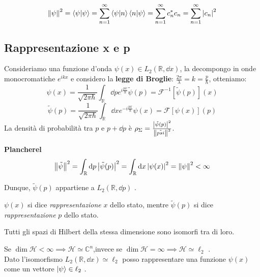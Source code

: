 \begin{example}
    \[
    \norm{\psi}^2= \braket{\psi}= \sum_{n=1}^{\infty} \braket{\psi}{n}\braket{n}{\psi}=
    \sum_{n=1}^{\infty}c^*_n c_n    = \sum_{n=1}^{\infty} \abs{c_n}^2   
    \]
\end{example}


\subsection{Rappresentazione x e p}
Consideriamo una funzione d'onda \(\psi(x) \in L_2(\mathbb{R}, \dd{x})\),
la decompongo in onde monocromatiche \(e^{ikx}\) e considero la \textbf{legge di Broglie}: \(\frac{2\pi}{\lambda}= k = \frac{p}{\hbar}\), otteniamo:
\[
\psi(x)= \frac{1}{\sqrt{2\pi\hbar}}\int_{\mathbb{R}} \dd{p} e^{i\frac{px}{\hbar}} \tilde{\psi}(p) = \mathcal{F}^{-1}[\tilde{\psi}(p)](x)
\]
\[
\tilde{\psi}(p)= \frac{1}{\sqrt{2\pi\hbar}}\int_{\mathbb{R}} \dd{x} e^{-i\frac{px}{\hbar}} \psi(x)= \mathcal{F}[\psi(x)](p)
\]
La densità di probabilità tra \(p\) e \(p +\dd{p}\) è \(\rho_\Sigma= \frac{\abs{\tilde{\psi}(p)}^2}{\norm{\tilde{psi}}^2}\).
\begin{theorem}
    \textbf{Plancherel}
    \[
    \norm{\tilde{\psi}}^2= \int_{\mathbb{R}} \dd{p} \abs{\tilde{\psi}(p)}^2= \int_{\mathbb{R}} \dd{x} \abs{\psi(x)}^2 = \norm{\psi}^2 <\infty
    \]
\end{theorem}
Dunque, \(\tilde{\psi}(p)\) appartiene a \(L_2(\mathbb{R},\dd{p})\) .

\begin{definition}
    \(\psi(x)\) si dice \textit{rappresentazione} \(x\) dello stato, mentre
    \(\tilde{\psi}(p)\) si dice \textit{rappresentazione} \(p\) dello stato.
\end{definition}

\begin{theorem}
    Tutti gli spazi di Hilbert della stessa dimensione sono isomorfi tra di loro.
\end{theorem}

\begin{example}
    Se \(\operatorname{dim} \mathcal{H} < \infty \implies \mathcal{H}\simeq \mathbb{C}^n\),invece
    se \(\operatorname{dim} \mathcal{H} = \infty \implies \mathcal{H} \simeq \ell_2\) .\\
    Dato l'isomorfismo \(L_2(\mathbb{R},\dd{x})\simeq \ell_2\) posso rappresentare una funzione \(\psi(x)\) come un vettore \(\ket{\psi}\in \ell_2\) .
\end{example}


